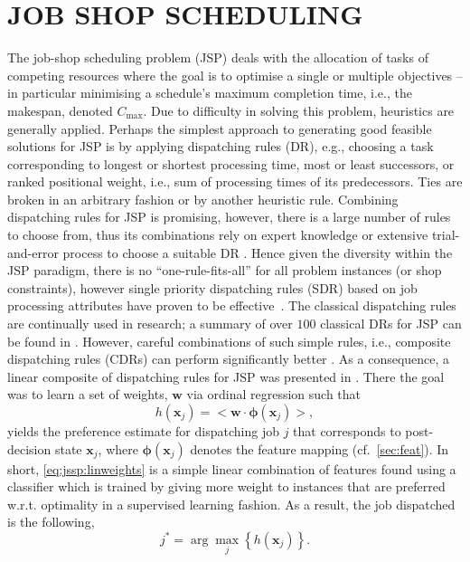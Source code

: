 \documentclass[a4paper,twoside]{article}
\renewcommand{\vec}[1]{\mathbf{#1}}
\newcommand{\vphi}{{\boldsymbol{\phi}}}
\newcommand{\inner}[2]{\big<{#1}\cdot{#2}\big>}
\begin{document}
\section{\uppercase{Job shop scheduling}}
The job-shop scheduling problem (JSP) deals with the allocation of tasks of competing resources where the goal is to optimise a single or multiple objectives -- in particular minimising a schedule's maximum completion time, i.e., the makespan, denoted $C_{\max}$. Due to difficulty in solving this problem, heuristics are generally applied. Perhaps the simplest approach to generating good feasible solutions for JSP is by applying dispatching rules (DR),  e.g., choosing a task corresponding to longest or shortest processing time, most or least successors, or ranked positional weight, i.e., sum of processing times of its predecessors. Ties are broken in an arbitrary fashion or by another heuristic rule. Combining dispatching rules for JSP is promising, however, there is a large number of rules to choose from, thus its combinations rely on expert knowledge or extensive trial-and-error process to choose a suitable DR \cite{Tay08}. Hence given the diversity within the JSP paradigm, there is no ``one-rule-fits-all'' for all problem instances (or shop constraints), however single priority dispatching rules (SDR) based on job processing attributes have proven to be effective~\cite{Haupt89}. 
The classical dispatching rules are continually used in research; a summary of over $100$ classical DRs for JSP can be found in \cite{Panwalkar77}. 
However, careful combinations of such simple rules, i.e., composite dispatching rules (CDRs) can perform significantly better \cite{Jayamohan04}. 
As a consequence, a linear composite of dispatching rules for JSP was presented in \cite{InRu11a}. There the goal was to learn a set of weights, $\vec{w}$ via ordinal regression such that 
\begin{equation}\label{eq:jssp:linweights}
h(\vec{x}_j)=\inner{\vec{w}}{\vphi(\vec{x}_j)},
\end{equation}
yields the preference estimate for dispatching job $j$ that corresponds to post-decision state $\vec{x}_j$, where $\vphi(\vec{x}_j)$ denotes the feature mapping (cf.~\cref{sec:feat}). 
In short, \cref{eq:jssp:linweights} is a simple linear combination of features found using a classifier which is trained by giving more weight to instances that are preferred w.r.t. optimality in a supervised learning fashion. As a result, the job dispatched is the following, 
\begin{equation}\label{eq:jstar}
j^* = \arg\max_j\left\{h(\vec{x}_j)\right\}. 
\end{equation}
\end{document}
